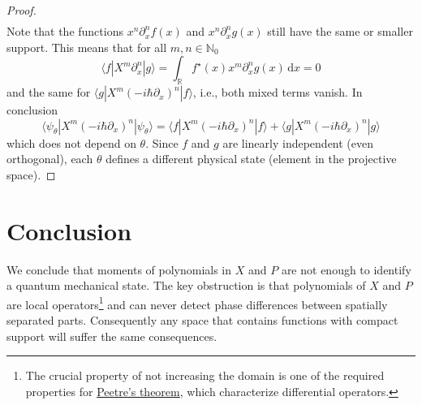 \documentclass{techbrief}
\begin{document}
\begin{proof}
\begin{equation}
\begin{split}
        \end{split}
    \end{equation}
    Note that the functions $x^n \partial_x^n f(x)$ and $x^n \partial_x^n g(x)$ still have the same or smaller support. This means that for all $m, n \in \mathbb{N}_0$
    \begin{equation}
        \langle f | X^m \partial_x^n | g \rangle = \int_\mathbb{R} f^\star(x) x^m \partial_x^n g(x) \, \mathrm{d}x = 0
    \end{equation}
    and the same for $\langle g | X^m (-i \hbar \partial_x)^n | f \rangle$, i.e., both mixed terms vanish. In conclusion
    \begin{equation}
        \langle \psi_\theta | X^m (-i \hbar \partial_x)^n | \psi_\theta \rangle = \langle f  | X^m (-i \hbar \partial_x)^n | f \rangle + \langle g | X^m (-i \hbar \partial_x)^n | g \rangle
    \end{equation}
    which does not depend on $\theta$. Since $f$ and $g$ are linearly independent (even orthogonal), each $\theta$ defines a different physical state (element in the projective space).
\end{proof}


\section{Conclusion}
We conclude that moments of polynomials in $X$ and $P$ are not enough to identify a quantum mechanical state. The key obstruction is that polynomials of $X$ and $P$ are local operators\footnote{The crucial property of not increasing the domain is one of the required properties for \href{https://en.wikipedia.org/wiki/Peetre_theorem}{Peetre's theorem}, which characterize differential operators.} and can never detect phase differences between spatially separated parts. Consequently any space that contains functions with compact support will suffer the same consequences.
\end{document}
